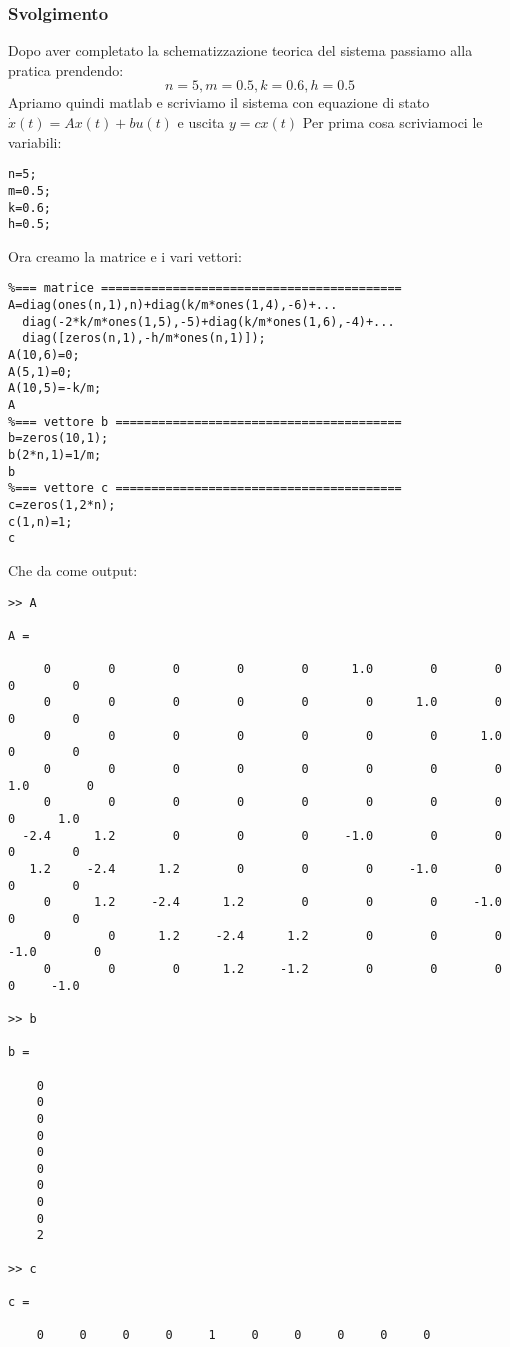 \documentclass[a4paper]{report}
\begin{document}
\subsubsection*{Svolgimento}
Dopo aver completato la schematizzazione teorica del sistema
passiamo alla pratica prendendo:
\[
n = 5, m = 0.5, k = 0.6, h = 0.5
\]
Apriamo quindi matlab e scriviamo il sistema  con equazione di stato $\dot{x}(t)=Ax(t)+bu(t)$ e uscita $y=cx(t)$
Per prima cosa scriviamoci le variabili:
\begin{verbatim}
n=5;
m=0.5;
k=0.6;
h=0.5;
\end{verbatim}
Ora creamo la matrice e i vari vettori:
\begin{verbatim}
%=== matrice ==========================================
A=diag(ones(n,1),n)+diag(k/m*ones(1,4),-6)+...
  diag(-2*k/m*ones(1,5),-5)+diag(k/m*ones(1,6),-4)+...
  diag([zeros(n,1),-h/m*ones(n,1)]);
A(10,6)=0;
A(5,1)=0;
A(10,5)=-k/m;
A
%=== vettore b ========================================
b=zeros(10,1);
b(2*n,1)=1/m;
b
%=== vettore c ========================================
c=zeros(1,2*n);
c(1,n)=1;
c
\end{verbatim}
\newpage
Che da come output:
\begin{verbatim}
>> A

A =
  
     0        0        0        0        0      1.0        0        0        0        0
     0        0        0        0        0        0      1.0        0        0        0
     0        0        0        0        0        0        0      1.0        0        0
     0        0        0        0        0        0        0        0      1.0        0
     0        0        0        0        0        0        0        0        0      1.0
  -2.4      1.2        0        0        0     -1.0        0        0        0        0
   1.2     -2.4      1.2        0        0        0     -1.0        0        0        0
     0      1.2     -2.4      1.2        0        0        0     -1.0        0        0
     0        0      1.2     -2.4      1.2        0        0        0     -1.0        0
     0        0        0      1.2     -1.2        0        0        0        0     -1.0
  
>> b
  
b =
  
    0
    0
    0
    0
    0
    0
    0
    0
    0
    2
  
>> c
  
c =
  
    0     0     0     0     1     0     0     0     0     0
\end{verbatim}
\end{document}
